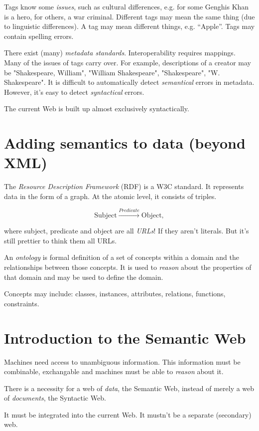 \documentclass{report}
\begin{document}
Tags know some \emph{issues}, such as cultural differences,
e.g. for some Genghis Khan is a hero, for others, a war criminal.
Different tags may mean the same thing
(due to linguistic differences).
A tag may mean different things, e.g. ``Apple''.
Tags may contain spelling errors.

There exist (many) \emph{metadata standards}.
Interoperability requires mappings.
Many of the issues of tags carry over.
For example, descriptions of a creator may be
"Shakespeare, William", "William Shakespeare",
"Shakespeare", "W. Shakespeare".
It is difficult to automatically detect
\emph{semantical} errors in metadata.
However, it's easy to detect \emph{syntactical} errors.

The current Web is built up
almost exclusively syntactically.

\section{Adding semantics to data (beyond XML)}

The \emph{Resource Description Framework} (RDF) is a W3C standard.
It represents data in the form of a graph.
At the atomic level, it consists of triples.

$$\text{Subject} \xrightarrow{Predicate} \text{Object},$$

where subject, predicate and object are all \emph{URLs}!
If they aren't literals.
But it's still prettier to think them all URLs.

An \emph{ontology} is formal definition
of a set of concepts within a domain
and the relationships between those concepts.
It is used to \emph{reason}
about the properties of that domain
and may be used to define the domain.

Concepts may include:
classes, instances, attributes,
relations, functions, constraints.

\section{Introduction to the Semantic Web}

Machines need access to unambiguous information.
This information must be combinable, exchangable
and machines must be able to \emph{reason} about it.

There is a necessity for a web of \emph{data},
the Semantic Web,
instead of merely a web of \emph{documents},
the Syntactic Web.

It must be integrated into the current Web.
It mustn't be a separate (secondary) web.
\end{document}
